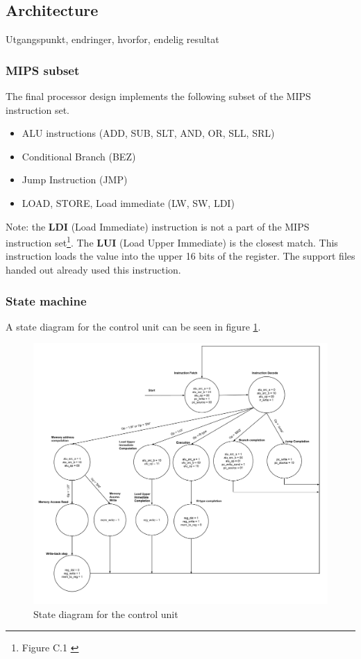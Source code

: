 \subsection{Architecture}

Utgangspunkt, endringer, hvorfor, endelig resultat

\subsubsection{MIPS subset}

The final processor design implements the following subset of the MIPS instruction set.

\begin{itemize}
    \item ALU instructions (ADD, SUB, SLT, AND, OR, SLL, SRL)
    \item Conditional Branch (BEZ)
    \item Jump Instruction (JMP)
    \item LOAD, STORE, Load immediate (LW, SW, LDI)
\end{itemize}

Note: the {\bf LDI} (Load Immediate) instruction is not a part of the MIPS instruction set\footnote{Figure C.1 \cite[p.66]{compendium}}.
The {\bf LUI} (Load Upper Immediate) is the closest match.
This instruction loads the value into the upper 16 bits of the register.
The support files handed out already used this instruction.

\subsubsection{State machine}

A state diagram for the control unit can be seen in figure \ref{fig:state_machine}.

\begin{figure}[ht!]
    \begin{center}
    \includegraphics[width=\textwidth]{assets/state_machine.pdf}
    \caption{State diagram for the control unit}
    \label{fig:state_machine}
    \end{center}
\end{figure}

